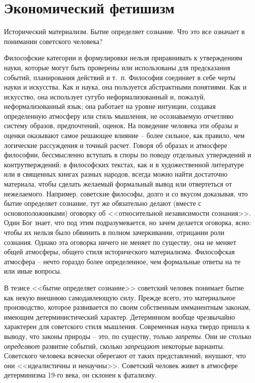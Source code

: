 \documentclass{book}
\begin{document}
\section{Экономический фетишизм}

Исторический материализм. Бытие определяет сознание. Что это все означает в понимании советского человека?

Философские категории и формулировки нельзя приравнивать к утверждениям науки, которые могут быть проверены или использованы для 
предсказания событий, планирования действий и т.~п. Философия соединяет в себе черты науки и искусства. Как и наука, она 
пользуется абстрактными понятиями. Как и искусство, она использует сугубо неформализован­ный и, пожалуй, неформализованный язык; 
она работает на уров­не интуиции, создавая определенную атмосферу или стиль мышления, не осознаваемую отчетливо систему образов, 
предпочтений, оценок. На поведение человека эти образы и оценки оказывают самое решающее влияние -- более сильное, как правило, 
чем логические рассуждения и точный расчет. Говоря об об­разах и атмосфере философии, бессмысленно вступать в споры по поводу 
отдельных утверждений и контрутверждений: в философских текстах, как и в художественной литературе или в священных книгах разных 
народов, всегда можно найти достаточно материала, чтобы сделать желаемый формальный вывод или отвертеться от нежелаемого. 
Например, советские философы, долго и со вкусом доказывая, что бытие определяет сознание, тут же обязательно делают (вместе с 
основоположника­ми) оговорку об <<относительной независимости сознания>>. Один Бог знает, что под этим подразумевается, но зачем 
делается оговорка, ясно: чтобы их нельзя было обвинить в полном зачеркивании, отрицании роли сознания. Однако эта оговорка 
ничего не меняет по существу, она не меняет общей атмосферы, общего стиля исторического материализма. Философская атмосфера -- 
нечто гораздо более определенное, чем формальные ответы на те или иные вопросы.

В тезисе <<бытие определяет сознание>> советский человек понимает бытие как некую внешнюю самодавлеющую силу. Прежде всего, это 
материальное производство, которое раз­вивается по своим собственным имманентным законам, имею­щим детерминистический характер. 
Детерминизм вообще чрезвычайно характерен для советского стиля мышления. Современная наука твердо пришла к выводу, что законы 
природы -- это, по существу, только \textit{запреты}.  Они не столько \textit{определяют} развитие событий, сколько 
\textit{запрещают}  некоторые варианты. Советского человека всячески оберегают от таких представле­ний, внушают, что они 
<<идеалистичны и ненаучны>>. Советский человек живет в атмосфере детерминизма 19-го века, он склонен к фатализму.
\end{document}
